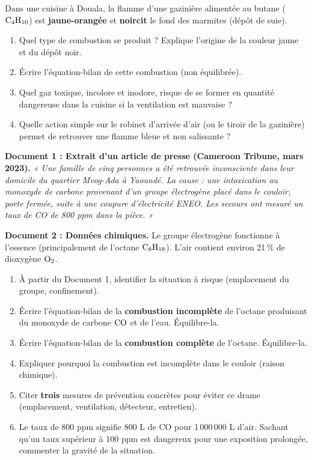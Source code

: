 \documentclass[11pt]{article}
\newcommand{\cle}[1]{{\popxbold\color{popdark}#1}}
\newcounter{popsec}
\newcounter{popsub}
\newcommand{\courssub}[1]{%
  \stepcounter{popsub}%
  \par\vspace{9pt}\noindent{\popxbold\fontsize{11.5}{13}\selectfont\color{popink}{\color{poporange}\thepopsec.\thepopsub}\hspace{6pt}#1}\par\nopagebreak\vspace{4pt}
}
\begin{document}
\begin{exercice}
Dans une cuisine à Douala, la flamme d'une gazinière alimentée au butane ($\ce{C4H10}$) est \textbf{jaune-orangée} et \textbf{noircit} le fond des marmites (dépôt de suie).
\begin{enumerate}
    \item Quel type de combustion se produit ? Explique l'origine de la couleur jaune et du dépôt noir.
    \item Écrire l'équation-bilan de cette combustion (non équilibrée).
    \item Quel \cle{gaz toxique}, incolore et inodore, risque de se former en quantité dangereuse dans la cuisine si la ventilation est mauvaise ?
    \item Quelle action simple sur le robinet d'arrivée d'air (ou le tiroir de la gazinière) permet de retrouver une flamme bleue et non salissante ?
\end{enumerate}
\end{exercice}

\courssub{Je me prépare au Bac}

\begin{exercice}
\textbf{Document 1 : Extrait d'un article de presse (Cameroon Tribune, mars 2023).}
\emph{« Une famille de cinq personnes a été retrouvée inconsciente dans leur domicile du quartier Mvog-Ada à Yaoundé. La cause : une intoxication au monoxyde de carbone provenant d'un groupe électrogène placé dans le couloir, porte fermée, suite à une coupure d'électricité ENEO. Les secours ont mesuré un taux de CO de 800 ppm dans la pièce. »}

\textbf{Document 2 : Données chimiques.}
Le groupe électrogène fonctionne à l'essence (principalement de l'octane $\ce{C8H18}$). L'air contient environ 21\,\% de dioxygène $\ce{O2}$.
\begin{enumerate}
    \item À partir du Document 1, identifier la situation à risque (emplacement du groupe, confinement).
    \item Écrire l'équation-bilan de la \textbf{combustion incomplète} de l'octane produisant du monoxyde de carbone $\ce{CO}$ et de l'eau. Équilibre-la.
    \item Écrire l'équation-bilan de la \textbf{combustion complète} de l'octane. Équilibre-la.
    \item Expliquer pourquoi la combustion est incomplète dans le couloir (raison chimique).
    \item Citer \textbf{trois} mesures de prévention concrètes pour éviter ce drame (emplacement, ventilation, détecteur, entretien).
    \item Le taux de 800 ppm signifie 800 L de CO pour 1\,000\,000 L d'air. Sachant qu'un taux supérieur à 100 ppm est dangereux pour une exposition prolongée, commenter la gravité de la situation.
\end{enumerate}
\end{exercice}
\end{document}
